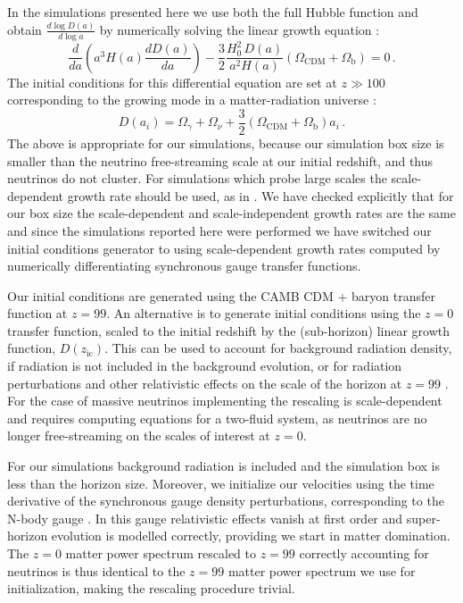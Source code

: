 \documentclass[useAMS, usenatbib]{mnras}
\begin{document}
In the simulations presented here we use both the full Hubble function
and obtain $\frac{d \log D(a)}{d \log a}$ by numerically solving
the linear growth equation \citep{Peebles:1993}:
\begin{equation}
\frac{d}{da}\left(a^3 H(a) \frac{d D(a)}{da}\right) - \frac{3}{2} \frac{H_0^2\,D(a)}{a^2 H(a)} \left(\Omega_\mathrm{CDM} + \Omega_\mathrm{b}\right)= 0\,.
\end{equation}
The initial conditions for this differential equation are set at $z \gg 100$ corresponding
to the growing mode in a matter-radiation universe \citep{Groth:1975}:
\begin{equation}
  D(a_i) = \Omega_\gamma + \Omega_\nu + \frac{3}{2} \left(\Omega_\mathrm{CDM} + \Omega_\mathrm{b}\right) a_i\,.
\end{equation}
The above is appropriate for our simulations, because our simulation box size is smaller than the neutrino free-streaming scale at our initial redshift, and thus neutrinos do not cluster. For simulations which probe large scales the scale-dependent growth rate should be used, as in \cite{OLeary_2012, Zennaro_2017}. We have checked explicitly that for our box size the scale-dependent and scale-independent growth rates are the same and since the simulations reported here were performed we have switched our initial conditions generator to using scale-dependent growth rates computed by numerically differentiating synchronous gauge transfer functions.

Our initial conditions are generated using the CAMB CDM + baryon transfer function at $z=99$. An alternative is to generate initial conditions
using the $z=0$ transfer function, scaled to the initial redshift by the (sub-horizon) linear growth function, $D(z_\mathrm{ic})$. This can be used to account for background radiation density, if radiation is not included in the background evolution, or for radiation perturbations and other relativistic effects on the scale of the horizon at $z=99$ \citep{Zennaro_2017}. For the case of massive neutrinos implementing the rescaling is scale-dependent and requires computing equations for a two-fluid system, as neutrinos are no longer free-streaming on the scales of interest at $z=0$.

For our simulations background radiation is included and the simulation box is less than the horizon size. Moreover, we initialize our velocities using the time derivative of the synchronous gauge density perturbations, corresponding to the N-body gauge \cite{Fidler_2015, Valkenburg_2017}. In this gauge relativistic effects vanish at first order and super-horizon evolution is modelled correctly, providing we start in matter domination. The $z=0$ matter power spectrum rescaled to $z=99$ correctly accounting for neutrinos is thus identical to the $z=99$ matter power spectrum we use for initialization, making the rescaling procedure trivial.
\end{document}
